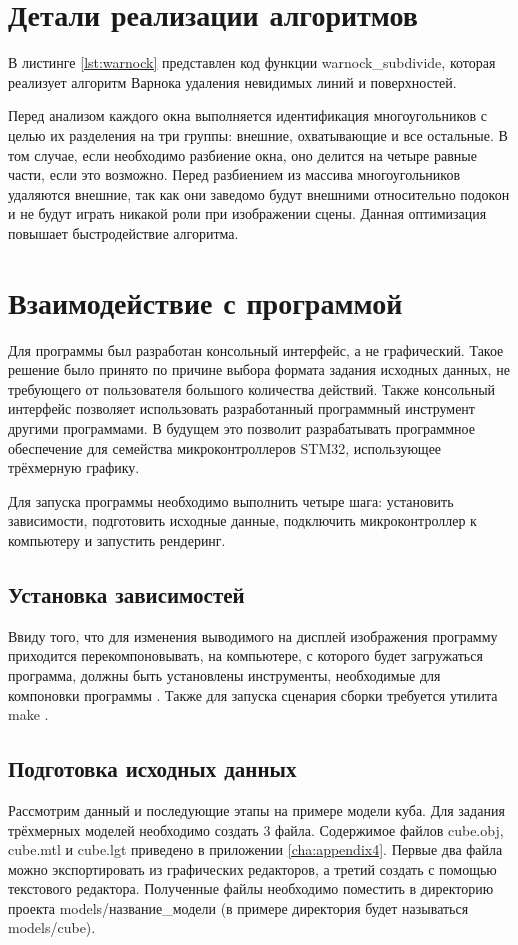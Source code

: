 \section{Детали реализации алгоритмов}
В листинге \ref{lst:warnock} представлен код функции warnock\_subdivide, которая реализует алгоритм Варнока удаления 
невидимых линий и поверхностей.


Перед анализом каждого окна выполняется идентификация многоугольников с целью их разделения на три группы: внешние, 
охватывающие и все остальные. В том случае, если необходимо разбиение окна, оно делится на четыре равные части, если это возможно. 
Перед разбиением из массива многоугольников удаляются внешние, так как они заведомо будут внешними относительно подокон и 
не будут играть никакой роли при изображении сцены. Данная оптимизация повышает быстродействие алгоритма.

\section{Взаимодействие с программой}
Для программы был разработан консольный интерфейс, а не графический. Такое решение было принято по причине выбора формата задания 
исходных данных, не требующего от пользователя большого количества действий. Также консольный интерфейс позволяет использовать 
разработанный программный инструмент другими программами. В будущем это позволит разрабатывать программное обеспечение для семейства 
микроконтроллеров STM32, использующее трёхмерную графику.

Для запуска программы необходимо выполнить четыре шага: установить зависимости, подготовить исходные данные, подключить 
микроконтроллер к компьютеру и запустить рендеринг.

\subsection{Установка зависимостей}
Ввиду того, что для изменения выводимого на дисплей изображения программу приходится перекомпоновывать, на компьютере, с которого 
будет загружаться программа, должны быть установлены инструменты, необходимые для компоновки программы \cite{toolchain}. 
Также для запуска сценария сборки требуется утилита make \cite{make}.

\subsection{Подготовка исходных данных}
Рассмотрим данный и последующие этапы на примере модели куба. Для задания трёхмерных моделей необходимо создать 3 файла. 
Содержимое файлов cube.obj, cube.mtl и cube.lgt приведено в приложении \ref{cha:appendix4}. Первые два файла можно экспортировать 
из графических редакторов, а третий создать с помощью текстового редактора. Полученные файлы необходимо поместить в директорию 
проекта models/название\_модели (в примере директория будет называться models/cube).

